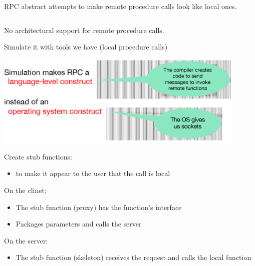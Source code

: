 \begin{slide}


    RPC abstract attempts to make remote procedure calls look like local ones.

\end{slide}

\begin{slide}


    \inputminted[fontsize=\scriptsize]{c}{wmsg.c}

\end{slide}

\begin{slide}

	
	No architectural support for remote procedure calls.
	\bigskip
	
	Simulate it with tools we have (local procedure calls)
	\bigskip
	
	\includegraphics[width=120mm]{implement-rpc.png}

\end{slide}

\begin{slide}


    Create stub functions:
	\begin{itemize}
		\item to make it appear to the user that the call is local
	\end{itemize}
	\bigskip
	
	On the clinet:
	\begin{itemize}
		\item The stub function (proxy) has the function’s interface
		\item Packages parameters and calls the server
	\end{itemize}
	\bigskip
	
	On the server:
	\begin{itemize}
		\item The stub function (skeleton) receives the request and calls the local function
	\end{itemize}

\end{slide}

